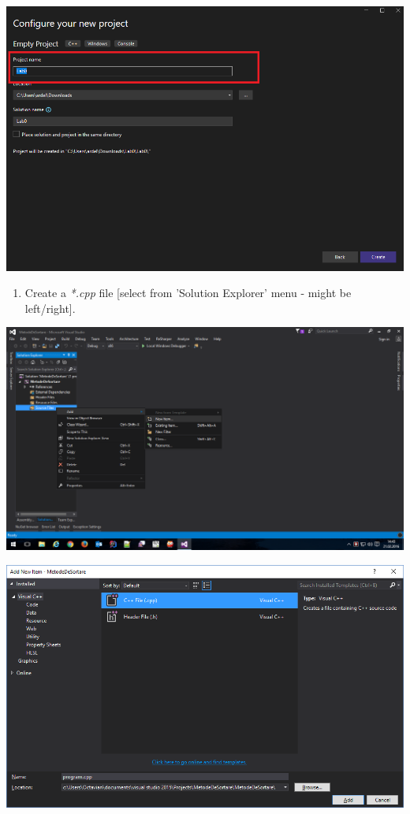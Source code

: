 \documentclass[../en-fa-lab.tex]{subfiles}
\begin{document}
\includegraphics[width=\textwidth]{../Resources/lab0/create_project3.png}

\begin{enumerate}
\def\labelenumi{\arabic{enumi}.}
\setcounter{enumi}{3}
\item
  Create a \emph{*.cpp} file [select from 'Solution Explorer' menu - might be left/right].
\end{enumerate}

\includegraphics[width=\textwidth]{../Resources/lab0/image4.png}

\includegraphics[width=\textwidth]{../Resources/lab0/image5.png}
\end{document}
